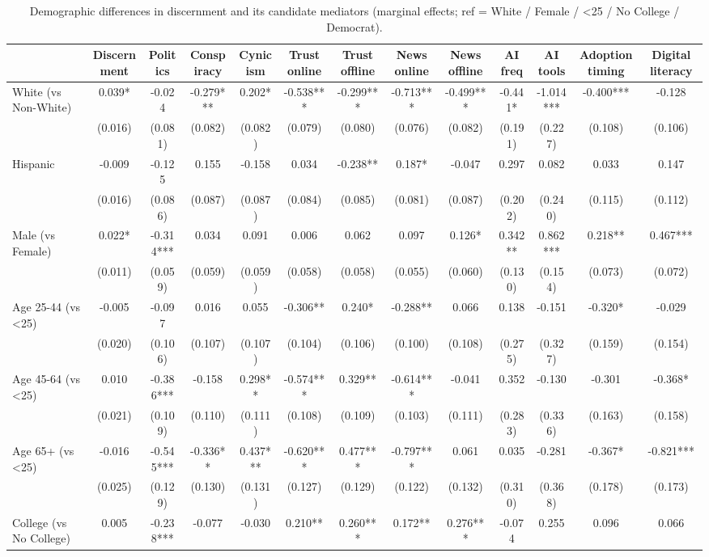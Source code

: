 \begin{table}
\centering
\caption{Demographic differences in discernment and its candidate mediators (marginal effects; ref = White / Female / <25 / No College / Democrat).}
\centering
\begin{tabular}[t]{lcccccccccccc}
\toprule
  & Discernment & Politics & Conspiracy & Cynicism & Trust online & Trust offline & News online & News offline & AI freq & AI tools & Adoption timing & Digital literacy\\
\midrule
White (vs Non-White) & 0.039* & -0.024 & -0.279*** & 0.202* & -0.538*** & -0.299*** & -0.713*** & -0.499*** & -0.441* & -1.014*** & -0.400*** & -0.128\\
 & (0.016) & (0.081) & (0.082) & (0.082) & (0.079) & (0.080) & (0.076) & (0.082) & (0.191) & (0.227) & (0.108) & (0.106)\\
Hispanic & -0.009 & -0.125 & 0.155 & -0.158 & 0.034 & -0.238** & 0.187* & -0.047 & 0.297 & 0.082 & 0.033 & 0.147\\
 & (0.016) & (0.086) & (0.087) & (0.087) & (0.084) & (0.085) & (0.081) & (0.087) & (0.202) & (0.240) & (0.115) & (0.112)\\
Male (vs Female) & 0.022* & -0.314*** & 0.034 & 0.091 & 0.006 & 0.062 & 0.097 & 0.126* & 0.342** & 0.862*** & 0.218** & 0.467***\\
 & (0.011) & (0.059) & (0.059) & (0.059) & (0.058) & (0.058) & (0.055) & (0.060) & (0.130) & (0.154) & (0.073) & (0.072)\\
Age 25-44 (vs <25) & -0.005 & -0.097 & 0.016 & 0.055 & -0.306** & 0.240* & -0.288** & 0.066 & 0.138 & -0.151 & -0.320* & -0.029\\
 & (0.020) & (0.106) & (0.107) & (0.107) & (0.104) & (0.106) & (0.100) & (0.108) & (0.275) & (0.327) & (0.159) & (0.154)\\
Age 45-64 (vs <25) & 0.010 & -0.386*** & -0.158 & 0.298** & -0.574*** & 0.329** & -0.614*** & -0.041 & 0.352 & -0.130 & -0.301 & -0.368*\\
 & (0.021) & (0.109) & (0.110) & (0.111) & (0.108) & (0.109) & (0.103) & (0.111) & (0.283) & (0.336) & (0.163) & (0.158)\\
Age 65+ (vs <25) & -0.016 & -0.545*** & -0.336** & 0.437*** & -0.620*** & 0.477*** & -0.797*** & 0.061 & 0.035 & -0.281 & -0.367* & -0.821***\\
 & (0.025) & (0.129) & (0.130) & (0.131) & (0.127) & (0.129) & (0.122) & (0.132) & (0.310) & (0.368) & (0.178) & (0.173)\\
College (vs No College) & 0.005 & -0.238*** & -0.077 & -0.030 & 0.210** & 0.260*** & 0.172** & 0.276*** & -0.074 & 0.255 & 0.096 & 0.066\\

\end{tabular}
\end{table}
